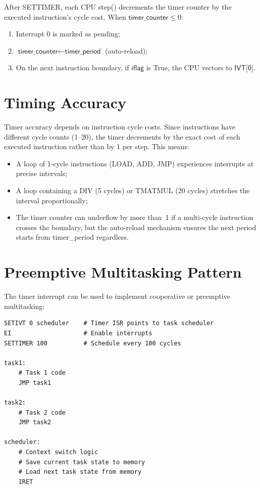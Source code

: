 \documentclass[12pt,a4paper,twoside]{book}
\theoremstyle{trinarytheorem}
\theoremstyle{trinarydefinition}
\newcommand{\code}[1]{\textsf{#1}}
\begin{document}
After SETTIMER, each CPU \code{step()} decrements the timer counter by the executed
instruction's cycle cost. When $\code{timer\_counter} \le 0$:
\begin{enumerate}
    \item Interrupt 0 is marked as pending;
    \item $\code{timer\_counter} \gets \code{timer\_period}$ (auto-reload);
    \item On the next instruction boundary, if $\code{iflag}$ is True, the CPU
          vectors to $\code{IVT[0]}$.
\end{enumerate}

\section{Timing Accuracy}

Timer accuracy depends on instruction cycle costs. Since instructions have different
cycle counts (1--20), the timer decrements by the exact cost of each executed
instruction rather than by 1 per step. This means:
\begin{itemize}
    \item A loop of 1-cycle instructions (LOAD, ADD, JMP) experiences interrupts at
          precise intervals;
    \item A loop containing a DIV (5 cycles) or TMATMUL (20 cycles) stretches the
          interval proportionally;
    \item The timer counter can underflow by more than~1 if a multi-cycle
          instruction crosses the boundary, but the auto-reload mechanism
          ensures the next period starts from \code{timer\_period} regardless.
\end{itemize}

\section{Preemptive Multitasking Pattern}

The timer interrupt can be used to implement cooperative or preemptive multitasking:

\begin{lstlisting}
SETIVT 0 scheduler    # Timer ISR points to task scheduler
EI                    # Enable interrupts
SETTIMER 100          # Schedule every 100 cycles

task1:
    # Task 1 code
    JMP task1

task2:
    # Task 2 code
    JMP task2

scheduler:
    # Context switch logic
    # Save current task state to memory
    # Load next task state from memory
    IRET
\end{lstlisting}
\end{document}
